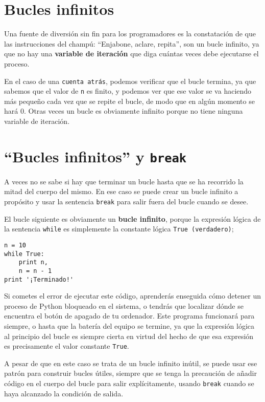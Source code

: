 \section{Bucles infinitos}

Una fuente de diversión sin fin para
los programadores es la constatación de que las instrucciones del champú:
``Enjabone, aclare, repita'', son un bucle infinito, ya que
no hay una {\bf variable de iteración} que diga cuántas veces
debe ejecutarse el proceso.


En el caso de una {\tt cuenta atrás}, podemos verificar que el bucle
termina, ya que sabemos que el valor de {\tt n} es finito, y podemos
ver que ese valor se va haciendo más pequeño cada vez que
se repite el bucle, de modo que en algún momento se hará 0. Otras veces
un bucle es obviamente infinito porque no tiene ninguna variable de iteración.

\section{``Bucles infinitos'' y {\tt break}}

A veces no se sabe si hay que terminar un bucle hasta que se ha
recorrido la mitad del cuerpo del mismo. En ese caso se puede crear un bucle infinito a propósito
y usar la sentencia {\tt break} para salir fuera del bucle cuando se desee.

El bucle siguiente es obviamente un {\bf bucle infinito}, porque la
expresión lógica de la sentencia
{\tt while} es simplemente la constante lógica {\tt True (verdadero)};

\beforeverb
\begin{verbatim}
n = 10
while True:
    print n, 
    n = n - 1
print '¡Terminado!'
\end{verbatim}
\afterverb
%
Si cometes el error de ejecutar este código, aprenderás enseguida cómo
detener un proceso de Python bloqueado en el sistema, o tendrás que localizar dónde
se encuentra el botón de apagado de tu ordenador.
Este programa funcionará para siempre,
o hasta que la batería del equipo se termine,
ya que la expresión lógica al principio del bucle
es siempre cierta en virtud del hecho de que esa expresión es
precisamente el valor constante {\tt True}.
 
A pesar de que en este caso se trata de un bucle infinito inútil, se puede usar ese patrón
para construir bucles útiles, siempre que se tenga la precaución de añadir código
en el cuerpo del bucle para salir explícitamente, usando {\tt break}
cuando se haya alcanzado la condición de salida.

